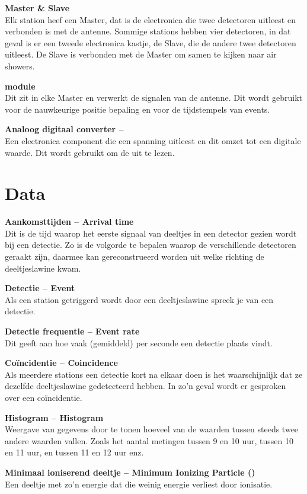 \textbf{Master \& Slave} \\
Elk station heef een Master, dat is de \hisparc electronica die twee
detectoren uitleest en verbonden is met de \gps antenne. Sommige
stations hebben vier detectoren, in dat geval is er een tweede \hisparc
electronica kastje, de Slave, die de andere twee detectoren uitleest. De
Slave is verbonden met de Master om samen te kijken naar air showers.

\textbf{\gps module} \\
Dit zit in elke Master en verwerkt de signalen van de \gps antenne. Dit
wordt gebruikt voor de nauwkeurige positie bepaling en voor de
tijdstempels van events.

\textbf{Analoog digitaal converter -- \adc} \\
Een electronica component die een spanning uitleest en dit omzet tot een
digitale waarde. Dit wordt gebruikt om de \pmts uit te lezen.


\section{Data}

\textbf{Aankomsttijden -- Arrival time} \\
Dit is de tijd waarop het eerste signaal van deeltjes in een detector
gezien wordt bij een detectie. Zo is de volgorde te bepalen waarop de
verschillende detectoren geraakt zijn, daarmee kan gereconstrueerd worden
uit welke richting de deeltjeslawine kwam.

\textbf{Detectie -- Event} \\
Als een station getriggerd wordt door een deeltjeslawine spreek je van
een detectie.

\textbf{Detectie frequentie -- Event rate} \\
Dit geeft aan hoe vaak (gemiddeld) per seconde een detectie plaats vindt.

\textbf{Coïncidentie -- Coincidence} \\
Als meerdere stations een detectie kort na elkaar doen is het
waarschijnlijk dat ze dezelfde deeltjeslawine gedetecteerd hebben. In
zo'n geval wordt er gesproken over een coïncidentie.

\textbf{Histogram -- Histogram} \\
Weergave van gegevens door te tonen hoeveel van de waarden tussen steeds
twee andere waarden vallen. Zoals het aantal metingen tussen 9 en 10
uur, tussen 10 en 11 uur, en tussen 11 en 12 uur enz.

\textbf{Minimaal ioniserend deeltje -- Minimum Ionizing Particle (\mip)} \\
Een deeltje met zo'n energie dat die weinig energie verliest door
ionisatie.

